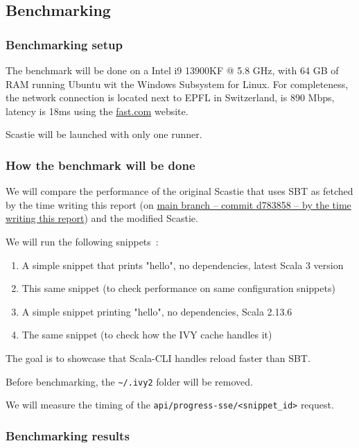 \documentclass{article}
\begin{document}
\subsection{Benchmarking}

\subsubsection{Benchmarking setup}

The benchmark will be done on a Intel i9 13900KF @ 5.8 GHz, with 64 GB of RAM running Ubuntu wit the Windows Subsystem for Linux. For completeness, the network connection is located next to EPFL in Switzerland, is 890 Mbps, latency is 18ms using the \href{https://fast.com}{fast.com} website.

Scastie will be launched with only one runner.

\subsubsection{How the benchmark will be done}

We will compare the performance of the original Scastie that uses SBT as fetched by the time writing this report (on \href{https://github.com/scalacenter/scastie/commit/d783858db0516eb5e7ed9f2a2101c85e8773afc0}{main branch -- commit d783858 -- by the time writing this report}) and the modified Scastie.


We will run the following snippets~:
\begin{enumerate}
    \item A simple snippet that prints "hello", no dependencies, latest Scala 3 version
    \item This same snippet (to check performance on same configuration snippets)
    \item A simple snippet printing "hello", no dependencies, Scala 2.13.6
    \item The same snippet (to check how the IVY cache handles it)
\end{enumerate}

The goal is to showcase that Scala-CLI handles reload faster than SBT.

Before benchmarking, the \lstinline{~/.ivy2} folder will be removed.

We will measure the timing of the \lstinline{api/progress-sse/<snippet_id>} request.

\subsubsection{Benchmarking results}
\end{document}
